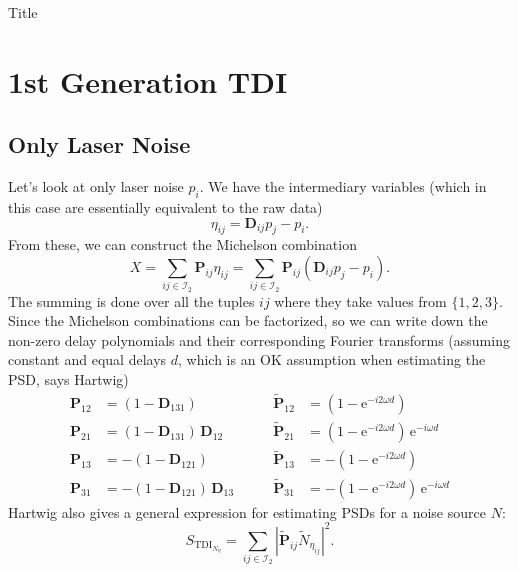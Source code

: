 \documentclass[11pt]{article}
\begin{document}
\begin{center}
 {\Large Title}
\end{center}

\bigskip

\section{1st Generation TDI}
\subsection{Only Laser Noise}
Let's look at only laser noise $p_i$. We have the intermediary variables (which in this case are essentially equivalent to the raw data)
\begin{equation*}
    \eta_{ij} = \mathbf{D}_{ij}p_j - p_i.
\end{equation*}
From these, we can construct the Michelson combination
\begin{equation}\label{X1}
    X=\sum_{ij\in \mathcal{I}_2}\mathbf{P}_{ij}\eta_{ij}=\sum_{ij\in \mathcal{I}_2}\mathbf{P}_{ij}(\mathbf{D}_{ij}p_j - p_i).
\end{equation}
The summing is done over all the tuples $ij$ where they take values from $\{1, 2, 3\}$. Since the Michelson combinations can be factorized, so we can write down the non-zero delay polynomials and their corresponding Fourier transforms (assuming constant and equal delays $d$, which is an OK assumption when estimating the PSD, says Hartwig)
\begin{align*}
    \mathbf{P}_{12}  &= (1-\mathbf{D}_{131}) 
        & \qquad \tilde{\mathbf{P}}_{12} &= (1-\mathrm{e}^{-i2\omega d}) \\[4pt]
    \mathbf{P}_{21}  &= (1-\mathbf{D}_{131})\,\mathbf{D}_{12} 
        & \qquad \tilde{\mathbf{P}}_{21} &= (1-\mathrm{e}^{-i2\omega d})\,\mathrm{e}^{-i\omega d} \\[4pt]
    \mathbf{P}_{13}  &= -(1-\mathbf{D}_{121}) 
        & \qquad \tilde{\mathbf{P}}_{13} &= -(1-\mathrm{e}^{-i2\omega d}) \\[4pt]
    \mathbf{P}_{31}  &= -(1-\mathbf{D}_{121})\,\mathbf{D}_{13} 
        & \qquad \tilde{\mathbf{P}}_{31} &= -(1-\mathrm{e}^{-i2\omega d})\,\mathrm{e}^{-i\omega d}
\end{align*}
Hartwig also gives a general expression for estimating PSDs for a noise source $N$:
\begin{equation}\label{PSD formula}
    S_{\text{TDI}_{N_{\eta}}}=\sum_{ij\in \mathcal{I}_2}\left|\tilde{\mathbf{P}}_{ij}\tilde{N}_{\eta_{ij}}\right|^2.
\end{equation}
\end{document}
